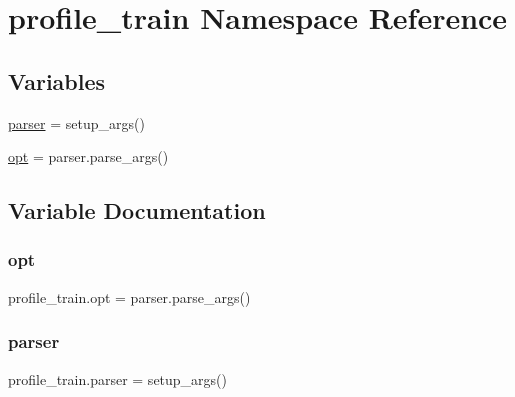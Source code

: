 \hypertarget{namespaceprofile__train}{}\section{profile\+\_\+train Namespace Reference}
\label{namespaceprofile__train}
\subsection*{Variables}
\begin{DoxyCompactItemize}
\item 
\hyperlink{namespaceprofile__train_a82ea6ec33dd7cd781e4e778f9e52112f}{parser} = setup\+\_\+args()
\item 
\hyperlink{namespaceprofile__train_afdda29d62ab3e138ea37cc14c6396a3e}{opt} = parser.\+parse\+\_\+args()
\end{DoxyCompactItemize}


\subsection{Variable Documentation}
\mbox{\label{namespaceprofile__train_afdda29d62ab3e138ea37cc14c6396a3e}} 
\subsubsection{\texorpdfstring{opt}{opt}}
{\footnotesize\ttfamily profile\+\_\+train.\+opt = parser.\+parse\+\_\+args()}

\mbox{\label{namespaceprofile__train_a82ea6ec33dd7cd781e4e778f9e52112f}} 
\subsubsection{\texorpdfstring{parser}{parser}}
{\footnotesize\ttfamily profile\+\_\+train.\+parser = setup\+\_\+args()}

